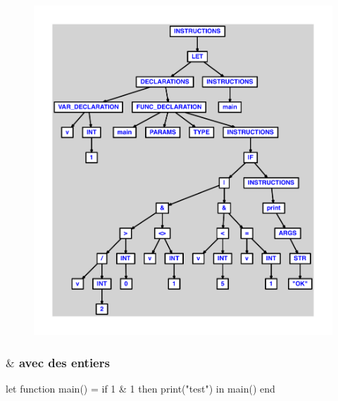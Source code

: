 \documentclass{article}
\begin{document}
\begin{figure}[H]\centering\includegraphics[max width=\textwidth]{ast/ast_4.pdf}\end{figure}\subsubsection{$ \& $ avec des entiers}
\begin{verbatimtab}
let
	function main() =
		if 1 & 1 then print("test")
in main() end
\end{verbatimtab}
\end{document}
